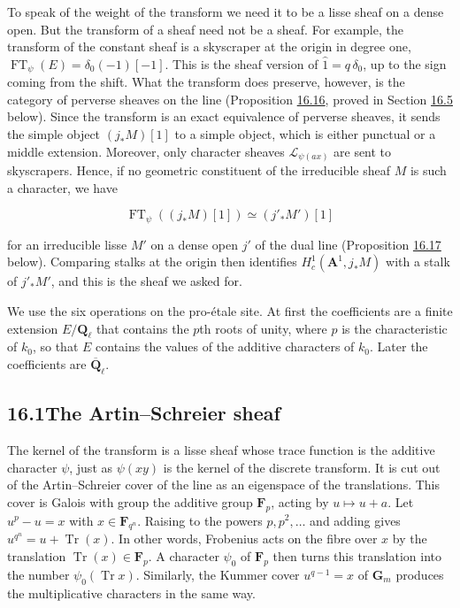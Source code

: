 \documentclass[11pt]{article}
\begin{document}
To speak of the weight of the transform we need it to be a lisse sheaf on a dense open. But the transform of a sheaf need not be a sheaf. For example, the transform of the constant sheaf is a skyscraper at the origin in degree one, \(\operatorname{FT}_\psi(E)=\delta_0(-1)[-1]\). This is the sheaf version of \(\hat1=q\,\delta_0\), up to the sign coming from the shift. What the transform does preserve, however, is the category of perverse sheaves on the line (Proposition \hyperref[bp214]{16.16}, proved in Section \hyperref[bp212]{16.5} below). Since the transform is an exact equivalence of perverse sheaves, it sends the simple object \((j_*M)[1]\) to a simple object, which is either punctual or a middle extension. Moreover, only character sheaves \(\mathcal L_{\psi(ax)}\) are sent to skyscrapers. Hence, if no geometric constituent of the irreducible sheaf \(M\) is such a character, we have

\[
\operatorname{FT}_\psi((j_*M)[1])\simeq(j'_*M')[1]
\]

for an irreducible lisse \(M'\) on a dense open \(j'\) of the dual line (Proposition \hyperref[bp218]{16.17} below). Comparing stalks at the origin then identifies \(H^1_c(\mathbf A^1,j_*M)\) with a stalk of \(j'_*M'\), and this is the sheaf we asked for.

We use the six operations on the pro-étale site. At first the coefficients are a finite extension \(E/\mathbf Q_\ell\) that contains the \(p\)th roots of unity, where \(p\) is the characteristic of \(k_0\), so that \(E\) contains the values of the additive characters of \(k_0\). Later the coefficients are \(\overline{\mathbf Q}_\ell\).

\subsection*{\texorpdfstring{16.1\quad The Artin–Schreier sheaf}{16.1 The Artin–Schreier sheaf}}
\label{bp169}%
\label{bp170}%
The kernel of the transform is a lisse sheaf whose trace function is the additive character \(\psi\), just as \(\psi(xy)\) is the kernel of the discrete transform. It is cut out of the Artin–Schreier cover of the line as an eigenspace of the translations. This cover is Galois with group the additive group \(\mathbf F_p\), acting by \(u\mapsto u+a\). Let \(u^p-u=x\) with \(x\in\mathbf F_{q^n}\). Raising to the powers \(p,p^2,\ldots\) and adding gives \(u^{q^n}=u+\operatorname{Tr}(x)\). In other words, Frobenius acts on the fibre over \(x\) by the translation \(\operatorname{Tr}(x)\in\mathbf F_p\). A character \(\psi_0\) of \(\mathbf F_p\) then turns this translation into the number \(\psi_0(\operatorname{Tr}x)\). Similarly, the Kummer cover \(u^{q-1}=x\) of \(\mathbf G_m\) produces the multiplicative characters in the same way.
\end{document}
